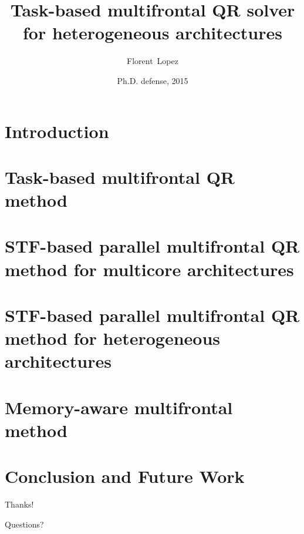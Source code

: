 \documentclass{beamer}
\author{Florent~Lopez}
\institute{Universit\'e Paul Sabatier-IRIT}
\title{Task-based multifrontal QR solver for heterogeneous
  architectures}
\date{Ph.D. defense, 2015}
\begin{document}
\nocite{a.b.g.l.:15,a.b.g.l.:14,a.b.g.l.:13,s.a.b.g.ea:15,a.a.b.b.ea:15,a.b.g.l:15*1,a.b.g.l:15*2,a.b.g.l:14*1,a.b.g.l:13*1,d.l:12}
\nocite{a.b.c.d.ea:14, e.m.s.v:15}

\begin{frame}[t,plain]
\titlepage

\end{frame}

\section{Introduction}

% 
\section{Task-based multifrontal QR method}

\section{STF-based parallel multifrontal QR method for multicore architectures}

\section{STF-based parallel multifrontal QR method for heterogeneous architectures}

\section{Memory-aware multifrontal method}

\section{Conclusion and Future Work}



\begin{frame}[plain]{}
  \begin{center}
    \vspace{2cm}

    {\Huge Thanks!}

    \vspace{1cm}

    {\huge Questions?}

    \vspace{2cm}

  \end{center}
\end{frame}
\end{document}
